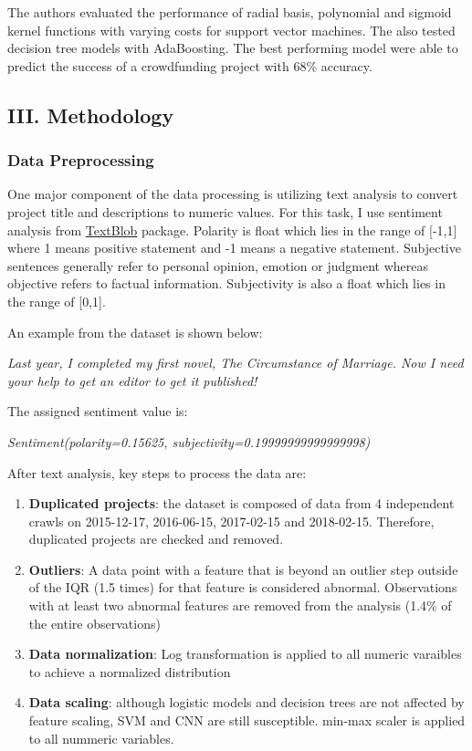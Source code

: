 \documentclass[11pt]{article}
\providecommand{\tightlist}{%
      \setlength{\itemsep}{0pt}\setlength{\parskip}{0pt}}
\begin{document}
The authors evaluated the performance of radial basis, polynomial and
sigmoid kernel functions with varying costs for support vector machines.
The also tested decision tree models with AdaBoosting. The best
performing model were able to predict the success of a crowdfunding
project with 68\% accuracy.

\subsection{III. Methodology}\label{iii.-methodology}

\subsubsection{Data Preprocessing}\label{data-preprocessing}

One major component of the data processing is utilizing text analysis to
convert project title and descriptions to numeric values. For this task,
I use sentiment analysis from
\href{https://textblob.readthedocs.io/en/dev/}{TextBlob} package.
Polarity is float which lies in the range of {[}-1,1{]} where 1 means
positive statement and -1 means a negative statement. Subjective
sentences generally refer to personal opinion, emotion or judgment
whereas objective refers to factual information. Subjectivity is also a
float which lies in the range of {[}0,1{]}.

An example from the dataset is shown below:

\emph{Last year, I completed my first novel, The Circumstance of
Marriage. Now I need your help to get an editor to get it published!}

The assigned sentiment value is:

\emph{Sentiment(polarity=0.15625, subjectivity=0.19999999999999998)}

After text analysis, key steps to process the data are:

\begin{enumerate}
\def\labelenumi{\arabic{enumi}.}
\tightlist
\item
  \textbf{Duplicated projects}: the dataset is composed of data from 4
  independent crawls on 2015-12-17, 2016-06-15, 2017-02-15 and
  2018-02-15. Therefore, duplicated projects are checked and removed.
\item
  \textbf{Outliers}: A data point with a feature that is beyond an
  outlier step outside of the IQR (1.5 times) for that feature is
  considered abnormal. Observations with at least two abnormal features
  are removed from the analysis (1.4\% of the entire observations)
\item
  \textbf{Data normalization}: Log transformation is applied to all
  numeric varaibles to achieve a normalized distribution
\item
  \textbf{Data scaling}: although logistic models and decision trees are
  not affected by feature scaling, SVM and CNN are still susceptible.
  min-max scaler is applied to all nummeric variables.
\end{enumerate}
\end{document}
